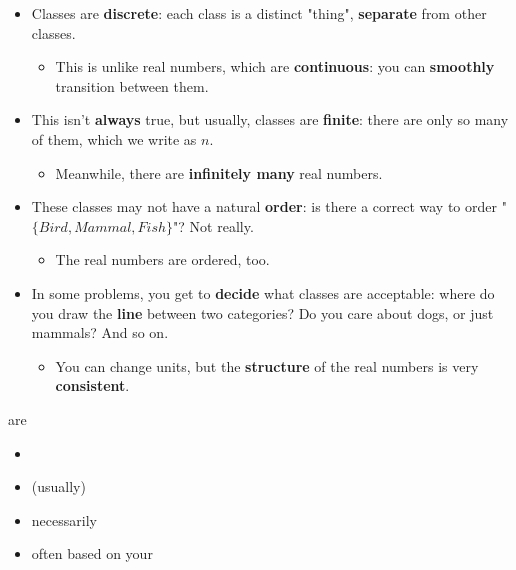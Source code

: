         \begin{itemize}
            \item Classes are \textbf{discrete}: each class is a distinct "thing", \textbf{separate} from other classes.
            
                \begin{itemize}
                    \item This is unlike real numbers, which are \textbf{continuous}: you can \textbf{smoothly} transition between them.
                \end{itemize}
            
            \item This isn't \textbf{always} true, but usually, classes are \textbf{finite}: there are only so many of them, which we write as $n$.
            
                \begin{itemize}
                    \item Meanwhile, there are \textbf{infinitely many} real numbers.
                \end{itemize}
            
            \item These classes may not have a natural \textbf{order}: is there a correct way to order "$\{ Bird, Mammal, Fish \}$"? Not really.
            
                \begin{itemize}
                    \item The real numbers are ordered, too.
                \end{itemize}
                
            \item In some problems, you get to \textbf{decide} what classes are acceptable: where do you draw the \textbf{line} between two categories? Do you care about dogs, or just mammals? And so on.
            
                \begin{itemize}
                    \item You can change units, but the \textbf{structure} of the real numbers is very \textbf{consistent}.\\
                \end{itemize}
        \end{itemize}
        
        \begin{concept}
             are 
            \begin{itemize}
                \item {}
                \item {} (usually)
                \item {} necessarily 
                \item often  based on your 
            \end{itemize}
        \end{concept}
        
